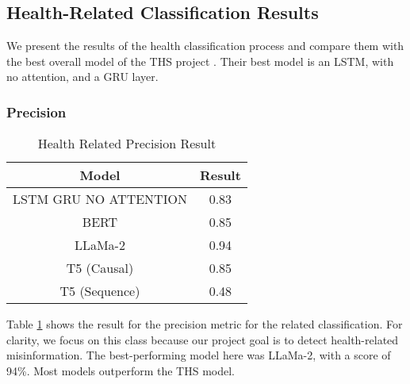 
\subsection{Health-Related Classification Results}
We present the results of the health classification process and compare them with the best overall model of the THS project \cite{8622504}.
Their best model is an LSTM, with no attention, and a GRU layer.

\subsubsection{Precision}
\begin{table}[htbp]
	\centering
	\caption{Health Related Precision Result}
	{\small
	\begin{tabular}{||c | c||} 
		\hline
		\textbf{Model} & \textbf{Result} \\ 
		\hline
		LSTM GRU NO ATTENTION & 0.83  \\
		\hline		
		BERT & 0.85  \\
		\hline
		LLaMa-2 & 0.94 \\ 
		\hline
		T5 (Causal) & 0.85 \\
		\hline
		T5 (Sequence) & 0.48 \\
		\hline
	\end{tabular}
	}
	\label{table:HealthPrecision}
\end{table}

Table \ref{table:HealthPrecision} shows the result for the precision metric for the related classification. For clarity, we focus on this class because our project
goal is to detect health-related misinformation. The best-performing model here was LLaMa-2, with a score of 94\%. Most models outperform the THS model.

